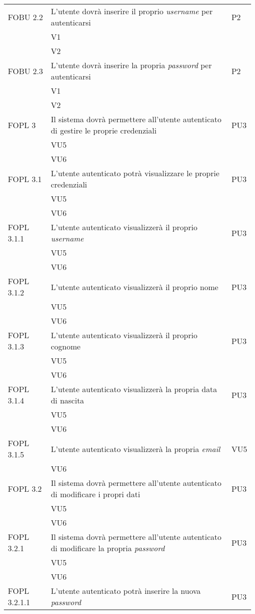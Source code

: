 \begin{longtable}{lXp{}}
\midrule 
FOBU 2.2&L'utente dovrà inserire il proprio \textit{username} per autenticarsi&P2\\ 
&V1\\ 
&V2\\
\midrule 
FOBU 2.3&L'utente dovrà inserire la propria \textit{password} per autenticarsi&P2\\
&V1\\ 
&V2\\ 
\midrule 
FOPL 3&Il sistema dovrà permettere all'utente autenticato di gestire le proprie credenziali&PU3\\ 
&VU5\\ 
&VU6\\ 
\midrule
FOPL 3.1&L'utente autenticato potrà visualizzare le proprie credenziali&PU3\\ 
&VU5\\ 
&VU6\\ 
\midrule 
FOPL 3.1.1&L'utente autenticato visualizzerà il proprio \textit{username}&PU3\\ 
&VU5\\ 
&VU6\\ 
\midrule 
FOPL 3.1.2&L'utente autenticato visualizzerà il proprio nome&PU3\\ 
&VU5\\ 
&VU6\\ 
\midrule 
FOPL 3.1.3&L'utente autenticato visualizzerà il proprio cognome&PU3\\ 
&VU5\\ 
&VU6\\ 
\midrule 
FOPL 3.1.4&L'utente autenticato visualizzerà la propria data di nascita&PU3\\ 
&VU5\\ 
&VU6\\
\midrule
FOPL 3.1.5&L'utente autenticato visualizzerà la propria \textit{email}&VU5\\ 
&VU6\\ 
\midrule 
FOPL 3.2&Il sistema dovrà permettere all'utente autenticato di modificare i propri dati&PU3\\ 
&VU5\\ 
&VU6\\ 
\midrule 
FOPL 3.2.1&Il sistema dovrà permettere all'utente autenticato di modificare la propria \textit{password}&PU3\\ 
&VU5\\ 
&VU6\\ 
\midrule 
FOPL 3.2.1.1&L'utente autenticato potrà inserire la nuova \textit{password}&PU3\\ 

\end{longtable}
